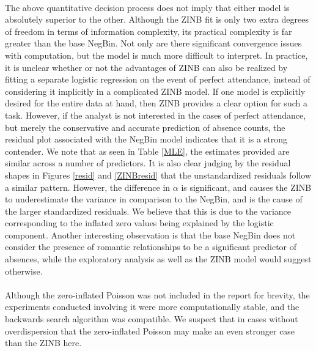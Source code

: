 \documentclass[12pt, titlepage]{article}
\begin{document}
	\paragraph{} The above quantitative decision process does not imply that either model is absolutely superior to the other. Although the ZINB fit is only two extra degrees of freedom in terms of information complexity, its practical complexity is far greater than the base NegBin. Not only are there significant convergence issues with computation, but the model is much more difficult to interpret. In practice, it is unclear whether or not the advantages of ZINB can also be realized by fitting a separate logistic regression on the event of perfect attendance, instead of considering it implicitly in a complicated ZINB model. If one model is explicitly desired for the entire data at hand, then ZINB provides a clear option for such a task. However, if the analyst is not interested in the cases of perfect attendance, but merely the conservative and accurate prediction of absence counts, the residual plot associated with the NegBin model indicates that it is a strong contender. We note that as seen in Table \ref{MLE}, the estimates provided are similar across a number of predictors. It is also clear judging by the residual shapes in Figures \ref{resid} and \ref{ZINBresid} that the unstandardized residuals follow a similar pattern.  However, the difference in $\alpha$ is significant, and causes the ZINB to underestimate the variance in comparison to the NegBin, and is the cause of the larger standardized residuals. We believe that this is due to the variance corresponding to the inflated zero values being explained by the logistic component. Another interesting observation is that the base NegBin does not consider the presence of romantic relationships to be a significant predictor of absences, while the exploratory analysis as well as the ZINB model would suggest otherwise.
	
	\paragraph{} Although the zero-inflated Poisson was not included in the report for brevity, the experiments conducted involving it were more computationally stable, and the backwards search algorithm was compatible. We suspect that in cases without overdispersion that the zero-inflated Poisson may make an even stronger case than the ZINB here. 
	
\end{document}
